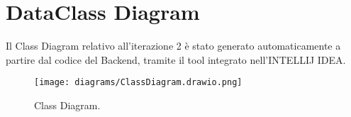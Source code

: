 \section{DataClass Diagram} 
Il Class Diagram relativo all'iterazione 2 è stato generato automaticamente a partire dal codice del Backend, tramite il tool integrato nell'INTELLIJ IDEA.
\begin{figure}[h!]
	\centering
	\texttt{[image: diagrams/ClassDiagram.drawio.png]}
	\caption{Class Diagram.}
	\label{fig:ComponentDiagram}
\end{figure}
